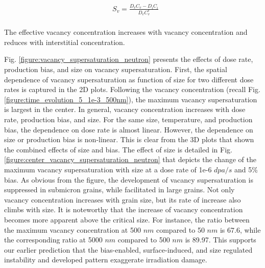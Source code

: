 \documentclass[utf8]{frontiersSCNS} %
\begin{document}
    \begin{equation}
        \begin{aligned}
        &S_v=\frac{D_vC_v-D_iC_i}{D_vC_v^e}\\
        \end{aligned}
    \end{equation}
    
    The effective vacancy concentration increases with vacancy concentration and reduces with interstitial concentration. 
    
    Fig. \ref{figure:vacancy_supersaturation_neutron} presents the effects of dose rate, production bias, and size on vacancy supersaturation. First, the spatial dependence of vacancy supersaturation as function of size for two different dose rates is captured in the 2D plots. Following the vacancy concentration (recall Fig. \ref{figure:time_evolution_5_1e-3_500nm}), the maximum vacancy supersaturation is largest in the center. In general, vacancy concentration increases with dose rate, production bias, and size. For the same size, temperature, and production bias, the dependence on dose rate is almost linear. However, the dependence on size or production bias is non-linear. This is clear from the 3D plots that shown the combined effects of size and bias. The effect of size is detailed in Fig. \ref{figure:center_vacancy_supersaturation_neutron} that depicts the change of the maximum vacancy supersaturation with size at a dose rate of 1e-6 $dpa/s$ and 5\% bias. As obvious from the figure, the development of vacancy supersaturation is suppressed in submicron grains, while facilitated in large grains. Not only vacancy concentration increases with grain size, but its rate of increase also climbs with size. It is noteworthy that the increase of vacancy concentration becomes more apparent above the critical size. For instance, the ratio between the maximum vacancy concentration at 500 $nm$ compared to 50 $nm$ is 67.6, while the corresponding ratio at 5000 $nm$ compared to 500 $nm$ is 89.97. This supports our earlier prediction that the bias-enabled, surface-induced, and size regulated instability and developed pattern exaggerate irradiation damage.     
\end{document}
